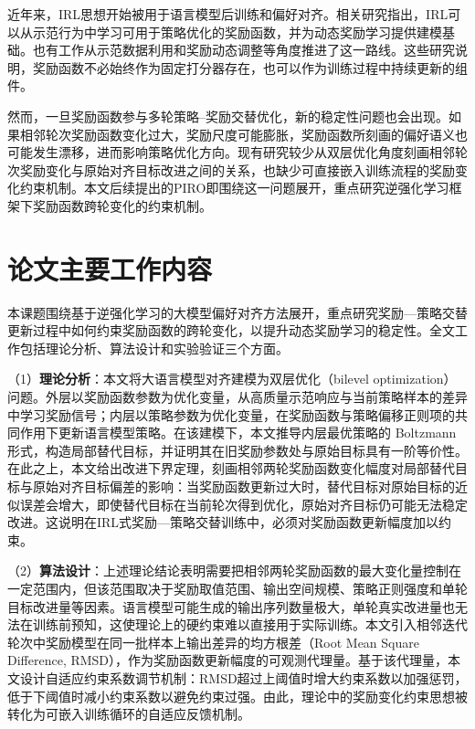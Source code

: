 近年来，IRL思想开始被用于语言模型后训练和偏好对齐。相关研究指出，IRL可以从示范行为中学习可用于策略优化的奖励函数，并为动态奖励学习提供建模基础\cite{irl_llm_survey_2025,wulfmeier2024irl}。也有工作从示范数据利用和奖励动态调整等角度推进了这一路线\cite{zeng2025d2r,cheng2026drirl}。这些研究说明，奖励函数不必始终作为固定打分器存在，也可以作为训练过程中持续更新的组件。

然而，一旦奖励函数参与多轮策略--奖励交替优化，新的稳定性问题也会出现。如果相邻轮次奖励函数变化过大，奖励尺度可能膨胀，奖励函数所刻画的偏好语义也可能发生漂移，进而影响策略优化方向。现有研究较少从双层优化角度刻画相邻轮次奖励变化与原始对齐目标改进之间的关系，也缺少可直接嵌入训练流程的奖励变化约束机制。本文后续提出的PIRO即围绕这一问题展开，重点研究逆强化学习框架下奖励函数跨轮变化的约束机制。

\section{论文主要工作内容}

本课题围绕基于逆强化学习的大模型偏好对齐方法展开，重点研究奖励—策略交替更新过程中如何约束奖励函数的跨轮变化，以提升动态奖励学习的稳定性。全文工作包括理论分析、算法设计和实验验证三个方面。

（1）\textbf{理论分析}：本文将大语言模型对齐建模为双层优化（bilevel optimization）问题。外层以奖励函数参数为优化变量，从高质量示范响应与当前策略样本的差异中学习奖励信号；内层以策略参数为优化变量，在奖励函数与策略偏移正则项的共同作用下更新语言模型策略。在该建模下，本文推导内层最优策略的 Boltzmann 形式，构造局部替代目标，并证明其在旧奖励参数处与原始目标具有一阶等价性。在此之上，本文给出改进下界定理，刻画相邻两轮奖励函数变化幅度对局部替代目标与原始对齐目标偏差的影响：当奖励函数更新过大时，替代目标对原始目标的近似误差会增大，即使替代目标在当前轮次得到优化，原始对齐目标仍可能无法稳定改进。这说明在IRL式奖励—策略交替训练中，必须对奖励函数更新幅度加以约束。

（2）\textbf{算法设计}：上述理论结论表明需要把相邻两轮奖励函数的最大变化量控制在一定范围内，但该范围取决于奖励取值范围、输出空间规模、策略正则强度和单轮目标改进量等因素。语言模型可能生成的输出序列数量极大，单轮真实改进量也无法在训练前预知，这使理论上的硬约束难以直接用于实际训练。本文引入相邻迭代轮次中奖励模型在同一批样本上输出差异的均方根差（Root Mean Square Difference, RMSD），作为奖励函数更新幅度的可观测代理量。基于该代理量，本文设计自适应约束系数调节机制：RMSD超过上阈值时增大约束系数以加强惩罚，低于下阈值时减小约束系数以避免约束过强。由此，理论中的奖励变化约束思想被转化为可嵌入训练循环的自适应反馈机制。

